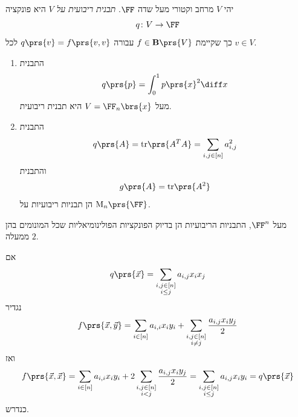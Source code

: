 \documentclass[a4paper,10pt,twoside,openany]{book}
\renewcommand{\Mat}{\mathrm{M}}
\begin{document}
\begin{definition}
יהי
$V$
מרחב וקטורי מעל שדה $\FF$.
\emph{תבנית ריבועית על
$V$}
היא פונקציה
\[q \colon V \to \FF\]
כך שקיימת
$f \in \mathbf{B}\prs{V}$
עבורה
$q\prs{v} = f\prs{v,v}$
לכל
$v \in V$.
\end{definition}

\begin{example}
\begin{enumerate}
\item התבנית
\begin{align*}
q\prs{p} = \int_0^1 p\prs{x}^2 \diff x
\end{align*}
מעל
$V = \FF_n\brs{x}$
היא תבנית ריבועית.

\item התבנית
\begin{align*}
q\prs{A} = \mathrm{tr}\prs{A^T A} = \sum_{i,j \in [n]} a_{i,j}^2
\end{align*}
והתבנית
\begin{align*}
g\prs{A} = \mathrm{tr}\prs{A^2}
\end{align*}
הן תבניות ריבועיות על
$\Mat_n\prs{\FF}$.
\end{enumerate}
\end{example}

\begin{example}
מעל
$\FF^n$,
התבניות הריבועיות הן בדיוק הפונקציות הפולינומיאליות שכל המונומים בהן ממעלה
$2$.

אם
\[q\prs{\vec{x}} = \sum_{\substack{i,j \in [n] \\ i \leq j}} a_{i, j} x_i x_j\]
נגדיר
\begin{align*}
f\prs{\vec{x}, \vec{y}} = \sum_{i \in [n]} a_{i,i} x_i y_i + \sum_{\substack{i,j \in [n] \\ i \neq j}} \frac{a_{i,j} x_i y_j}{2}
\end{align*}
ואז
\begin{align*}
f\prs{\vec{x}, \vec{x}} = \sum_{i \in [n]} a_{i,i} x_i y_i + 2 \sum_{\substack{i,j \in [n] \\ i < j}} \frac{a_{i,j} x_i y_j}{2} = \sum_{\substack{i,j \in [n] \\ i \leq j}} a_{i,j} x_i y_i = q\prs{\vec{x}}
\end{align*}
כנדרש.
\end{example}
\end{document}
